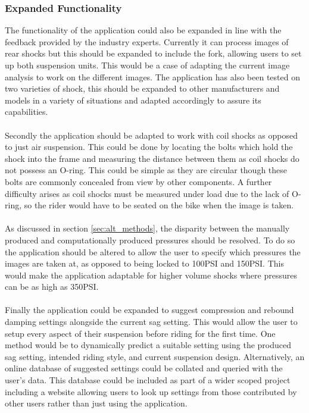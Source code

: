 		\subsubsection{Expanded Functionality}
			The functionality of the application could also be expanded in line with the feedback provided by the industry experts. Currently it can process images of rear shocks but this should be expanded to include the fork, allowing users to set up both suspension units. This would be a case of adapting the current image analysis to work on the different images. The application has also been tested on two varieties of shock, this should be expanded to other manufacturers and models in a variety of situations and adapted accordingly to assure its capabilities.
			\\\\
			Secondly the application should be adapted to work with coil shocks as opposed to just air suspension. This could be done by locating the bolts which hold the shock into the frame and measuring the distance between them as coil shocks do not possess an O-ring. This could be simple as they are circular though these bolts are commonly concealed from view by other components. A further difficulty arises as coil shocks must be measured under load due to the lack of O-ring, so the rider would have to be seated on the bike when the image is taken.
			\\\\
			As discussed in section \ref{sec:alt_methods}, the disparity between the manually produced and computationally produced pressures should be resolved. To do so the application should be altered to allow the user to specify which pressures the images are taken at, as opposed to being locked to 100PSI and 150PSI. This would make the application adaptable for higher volume shocks where pressures can be as high as 350PSI.
			\\\\
			Finally the application could be expanded to suggest compression and rebound damping settings alongside the current sag setting. This would allow the user to setup every aspect of their suspension before riding for the first time. One method would be to dynamically predict a suitable setting using the produced sag setting, intended riding style, and current suspension design. Alternatively, an online database of suggested settings could be collated and queried with the user's data. This database could be included as part of a wider scoped project including a website allowing users to look up settings from those contributed by other users rather than just using the application.
